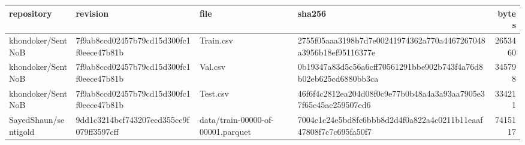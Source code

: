 \begin{tabular}{llllr}
\toprule
repository & revision & file & sha256 & bytes \\
\midrule
khondoker/SentNoB & 7f9ab8ccd02457b79cd15d300fc1f0eece47b81b & Train.csv & 2755f05aaa3198b7d7e00241974362a770a4467267048a3956b18ef95116377e & 2653460 \\
khondoker/SentNoB & 7f9ab8ccd02457b79cd15d300fc1f0eece47b81b & Val.csv & 0b19347a83d5c56a6cff70561291bbe902b743f4a76d8b02eb625cd6880bb3ca & 345798 \\
khondoker/SentNoB & 7f9ab8ccd02457b79cd15d300fc1f0eece47b81b & Test.csv & 46f6f4c2812ea204d08f0c9e77b0b48a4a3a93aa7905e37f65e45ac259507ed6 & 334211 \\
SayedShaun/sentigold & 9dd1c3214bcf743207ecd355cc9f079ff3597cff & data/train-00000-of-00001.parquet & 7004c1c24e5bd8fc6bbb8d2d4f0a822a4c0211b11eaaf47808f7c7c695fa50f7 & 7415117 \\
\bottomrule
\end{tabular}
